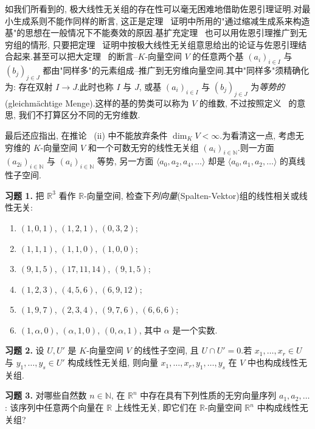 如我们所看到的, 极大线性无关组的存在性可以毫无困难地借助佐恩引理证明.对最小生成系则不能作同样的断言, 这正是定理~ 证明中所用的"通过缩减生成系来构造基"的思想在一般情况下不能奏效的原因.基扩充定理~ 也可以用佐恩引理推广到无穷组的情形, 只要把定理~ 证明中按极大线性无关组意思给出的论证与佐恩引理结合起来.甚至可以把大定理~ 的断言--$K$-向量空间 $V$ 的任意两个基 $(a_i)_{i \in I}$ 与 $(b_j)_{j \in J}$ 都由"同样多"的元素组成--推广到无穷维向量空间.其中"同样多"须精确化为: 存在双射 $I \longrightarrow J$.此时也称 $I$ 与 $J$, 或基 $(a_i)_{i \in I}$ 与 $(b_j)_{j \in J}$ 为\emph{等势的}(\textup{gleichmächtige Menge}).这样的基的势类可以称为 $V$ 的维数, 不过按照定义~ 的意思, 我们不打算区分不同的无穷维数.

最后还应指出, 在推论~ (ii) 中不能放弃条件 $\dim_K V < \infty$.为看清这一点, 考虑无穷维的 $K$-向量空间 $V$ 和一个可数无穷的线性无关组 $(a_i)_{i \in \mathbb{N}}$.则一方面 $(a_{2i})_{i \in \mathbb{N}}$ 与 $(a_i)_{i \in \mathbb{N}}$ 等势, 另一方面 $\langle a_0, a_2, a_4, \ldots \rangle$ 却是 $\langle a_0, a_1, a_2, \ldots \rangle$ 的真线性子空间.

\aufgaben

\noindent\textbf{习题 1.} 把 $\mathbb{R}^3$ 看作 $\mathbb{R}$-向量空间, 检查下\emph{列向量}(\textup{Spalten-Vektor})组的线性相关或线性无关:
\begin{enumerate}
\item[(i)] $(1, 0, 1)$, $(1, 2, 1)$, $(0, 3, 2)$;
\item[(ii)] $(1, 1, 1)$, $(1, 1, 0)$, $(1, 0, 0)$;
\item[(iii)] $(9, 1, 5)$, $(17, 11, 14)$, $(9, 1, 5)$;
\item[(iv)] $(1, 2, 3)$, $(4, 5, 6)$, $(6, 9, 12)$;
\item[(v)] $(1, 9, 7)$, $(2, 3, 4)$, $(9, 7, 6)$, $(6, 6, 6)$;
\item[(vi)] $(1, \alpha, 0)$, $(\alpha, 1, 0)$, $(0, \alpha, 1)$, 其中 $\alpha$ 是一个实数.
\end{enumerate}

\medskip
\noindent\textbf{习题 2.} 设 $U, U'$ 是 $K$-向量空间 $V$ 的线性子空间, 且 $U \cap U' = 0$.若 $x_1, \ldots, x_r \in U$ 与 $y_1, \ldots, y_s \in U'$ 构成线性无关组, 则向量 $x_1, \ldots, x_r, y_1, \ldots, y_s$ 在 $V$ 中也构成线性无关组.

\medskip
\noindent\textbf{习题 3.} 对哪些自然数 $n \in \mathbb{N}$, 在 $\mathbb{R}^n$ 中存在具有下列性质的无穷向量序列 $a_1, a_2, \ldots$: 该序列中任意两个向量在 $\mathbb{R}$ 上线性无关, 即它们在 $\mathbb{R}$-向量空间 $\mathbb{R}^n$ 中构成线性无关组?


